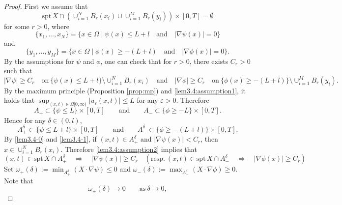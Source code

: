 \documentclass{amsart}
\theoremstyle{definition}
\newcommand{\spt}{\mathrm{spt}\,}
\begin{document}
\begin{proof}
First we assume that 
\begin{equation}\label{lem3.4:assumption2}
\spt X \cap \left( \cup_{i=1} ^N B_r (x_i) \cup \cup_{i=1} ^M B_r (y_i) \right)
\times [0,T] = \emptyset
\end{equation}
for some $r>0$, 
where 
\[
\{x_1,\dots,x_N\}
=\{ x \in \Omega \mid \psi (x) \leq L+l \quad \text{and} \quad
    |\nabla \psi (x)|=0 \}
\]
and
\[
\{y_1,\dots,y_M \}
=\{ x \in \Omega \mid \phi (x) \geq -(L+l) \quad \text{and} \quad
    |\nabla \phi (x)|=0 \}.
\]
By the assumptions for $\psi$ and $\phi$, one can check that 
for $r>0$, there exists $C_r >0$ such that
\begin{equation}\label{lem3.4-0}
|\nabla \psi | \geq C_r \quad \text{on} \ \{ \psi (x) \leq L+l \} \setminus \cup_{i=1} ^N B_r (x_i)
\quad \text{and} \quad 
|\nabla \phi | \geq C_r \quad \text{on} \ \{ \phi (x) \geq -(L+l) \} \setminus \cup_{i=1} ^M B_r (y_i).
\end{equation}
By the maximum principle (Proposition \ref{prop:mp}) and \eqref{lem3.4:assumption1},
it holds that $\sup_{(x,t) \in \Omega [0,\infty)} |u_\varepsilon (x,t)| \leq L $ for any $\varepsilon >0$. Therefore 
\begin{equation*}
A_+ \subset \{ \psi \leq L \} \times [0,T]
\qquad \text{and} \qquad
A_- \subset \{ \phi \geq -L \} \times [0,T] .
\end{equation*}
Hence for any $\delta \in (0,l)$, 
\begin{equation}\label{lem3.4-1}
A_+ ^\delta \subset \{ \psi \leq L +l \} \times [0,T]
\qquad \text{and} \qquad
A_- ^\delta \subset \{ \phi \geq -(L+l) \} \times [0,T] .
\end{equation}
By \eqref{lem3.4-0} and \eqref{lem3.4-1}, if $(x,t) \in A_+ ^\delta$ and $|\nabla \psi (x)| <C_r$,
then $x \in \cup_{i=1} ^N B_r (x_i)$. Therefore \eqref{lem3.4:assumption2} implies that
\begin{equation}\label{lem3.4-2}
(x,t) \in \spt X \cap A_+^\delta
\quad \Rightarrow \quad
|\nabla \psi (x) | \geq C_r
\quad
(\text{resp.} \ (x,t) \in \spt X \cap A_- ^\delta
\quad \Rightarrow \quad
|\nabla \phi (x) | \geq C_r
)
\end{equation}
Set $\omega _+ (\delta) := \min_{A_+ ^\delta} (X \cdot \nabla \psi) \leq 0$ and
$\omega _- (\delta) := \max_{A_- ^\delta} (X \cdot \nabla \phi) \geq 0$. Note that
\begin{equation}
\omega _{\pm} (\delta) \to 0 \qquad \text{as} \ \delta \to 0,
\end{equation}

\end{proof}
\end{document}
